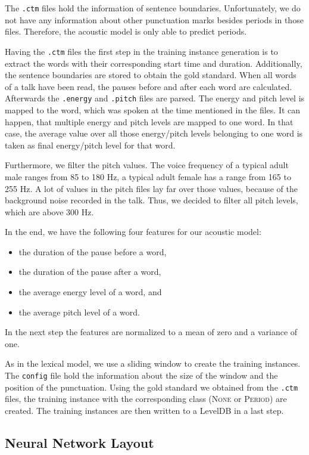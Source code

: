 The \texttt{.ctm} files hold the information of sentence boundaries.
Unfortunately, we do not have any information about other punctuation marks besides periods in those files.
Therefore, the acoustic model is only able to predict periods.

Having the \texttt{.ctm} files the first step in the training instance generation is to extract the words with their corresponding start time and duration.
Additionally, the sentence boundaries are stored to obtain the gold standard.
When all words of a talk have been read, the pauses before and after each word are calculated.
Afterwards the \texttt{.energy} and \texttt{.pitch} files are parsed.
The energy and pitch level is mapped to the word, which was spoken at the time mentioned in the files.
It can happen, that multiple energy and pitch levels are mapped to one word.
In that case, the average value over all those energy/pitch levels belonging to one word is taken as final energy/pitch level for that word.

Furthermore, we filter the pitch values.
The voice frequency of a typical adult male ranges from 85 to 180 Hz, a typical adult female has a range from 165 to 255 Hz.
A lot of values in the pitch files lay far over those values, because of the background noise recorded in the talk.
Thus, we decided to filter all pitch levels, which are above 300 Hz.

In the end, we have the following four features for our acoustic model:
\begin{itemize}
	\item the duration of the pause before a word,
	\item the duration of the pause after a word,
	\item the average energy level of a word, and
	\item the average pitch level of a word.
\end{itemize}
In the next step the features are normalized to a mean of zero and a variance of one.

As in the lexical model, we use a sliding window to create the training instances.
The \texttt{config} file hold the information about the size of the window and the position of the punctuation.
Using the gold standard we obtained from the \texttt{.ctm} files, the training instance with the corresponding class (\textsc{None} or \textsc{Period}) are created.
The training instances are then written to a LevelDB in a last step.

\subsection{Neural Network Layout}

